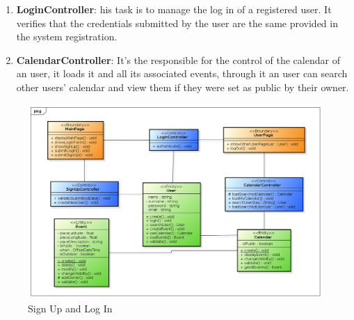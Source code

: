 \begin{itemize}
\begin{enumerate}
\item  {\bf LoginController}: his task is to manage the log in of a registered user. It verifies that the credentials submitted by the user are the same provided in the system registration.   
\item  {\bf CalendarController}: It's the responsible for the control of the calendar of an user, it loads it and all its associated events, through it an user can search other users' calendar and view them if they were set as public by their owner.
\end{enumerate}
\begin{center}
 \begin{figure}[H]
    \includegraphics[width=1\textwidth]{../BCEDiagram/BCE/EntityOverview/LoginBCE.png}
    \caption{Sign Up and Log In}
     \label{fig:logBCE}
     \end{figure}
   \end{center}  
\end{itemize}

